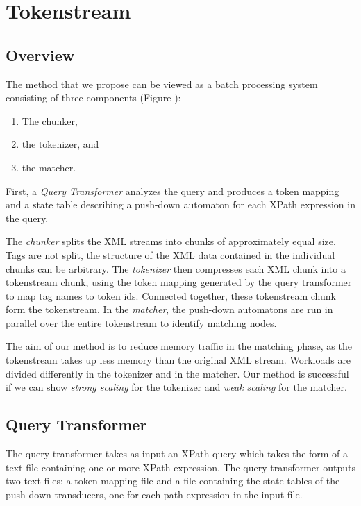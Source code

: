 \section{Tokenstream}\label{sec:yourmethod}


\subsection{Overview}

The method that we propose can be viewed as a batch processing system consisting
of three components (Figure ):

\begin{enumerate}
\item The chunker,
\item the tokenizer, and
\item the matcher.
\end{enumerate}

First, a \emph{Query Transformer} analyzes the query and produces a token
mapping and a state table describing a push-down automaton for each XPath
expression in the query.

The \emph{chunker} splits the XML streams into chunks of approximately equal
size. Tags are not split, the structure of the XML data contained in the
individual chunks can be arbitrary. The \emph{tokenizer} then compresses each
XML chunk into a tokenstream chunk, using the token mapping generated by the
query transformer to map tag names to token ids. Connected together, these
tokenstream chunk form the tokenstream. In the \emph{matcher}, the push-down
automatons are run in parallel over the entire tokenstream to identify matching
nodes.

The aim of our method is to reduce memory traffic in the matching phase, as the
tokenstream takes up less memory than the original XML stream. Workloads are
divided differently in the tokenizer and in the matcher. Our method is
successful if we can show \emph{strong scaling} for the tokenizer and \emph{weak
scaling} for the matcher.

\subsection{Query Transformer}

The query transformer takes as input an XPath query which takes the form of a
text file containing one or more XPath expression. The query transformer outputs
two text files: a token mapping file and a file containing the state tables of
the push-down transducers, one for each path expression in the input file.

